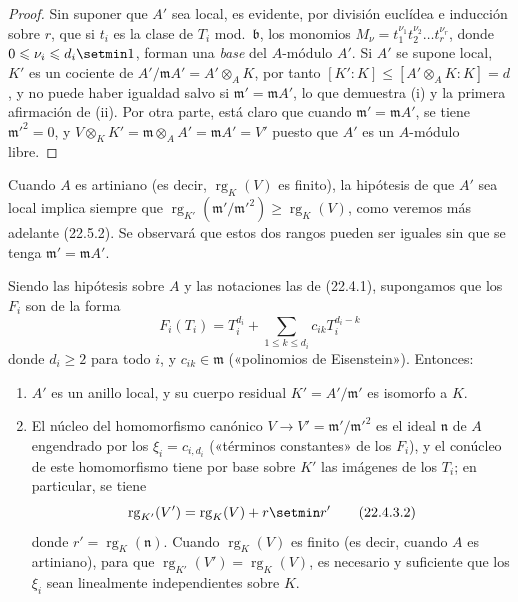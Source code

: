 \begin{proof}
Sin suponer que $A'$ sea local, es evidente, por división euclídea e
inducción sobre $r$, que si $t_i$ es la clase de $T_i$ mod.~$\mathfrak b$,
los monomios
$M_\nu=t_1^{\nu_1}t_2^{\nu_2}\ldots t_r^{\nu_r}$, donde
$0\leqslant\nu_i\leqslant d_i\setmin 1$, forman una \emph{base} del $A$-módulo $A'$. Si
$A'$ se supone local, $K'$ es un cociente de
$A'/\mathfrak mA'=A'\otimes_AK$, por tanto
$[K':K]\leqslant[A'\otimes_AK:K]=d$, y no puede haber igualdad salvo si
$\mathfrak m'=\mathfrak mA'$, lo que demuestra (i) y la primera afirmación
de (ii). Por otra parte, está claro que cuando
$\mathfrak m'=\mathfrak mA'$, se tiene $\mathfrak m'^2=0$, y
$V\otimes_KK'=\mathfrak m\otimes_AA'=\mathfrak mA'=V'$ puesto que $A'$ es
un $A$-módulo libre.
\end{proof}

\begin{remark}[22.4.2]
\label{0.22.4.2-fr}
Cuando $A$ es artiniano (es decir, $\operatorname{rg}_K(V)$ es finito),
la hipótesis de que $A'$ sea local implica siempre que
$\operatorname{rg}_{K'}(\mathfrak m'/\mathfrak m'^2)
\geqslant\operatorname{rg}_K(V)$, como veremos más adelante (22.5.2).
Se observará que estos dos rangos pueden ser iguales sin que se tenga
$\mathfrak m'=\mathfrak mA'$.
\end{remark}

\begin{proposition}[22.4.3]
\label{0.22.4.3-fr}
Siendo las hipótesis sobre $A$ y las notaciones las de \textup{(22.4.1)}, supongamos
que los $F_i$ son de la forma
\begin{equation}
\label{0.22.4.3.1-fr}
  F_i(T_i)=T_i^{d_i}+\sum_{1\leqslant k\leqslant d_i}
  c_{ik}T_i^{d_i-k}
  \tag{22.4.3.1}
\end{equation}
donde $d_i\geqslant2$ para todo $i$, y $c_{ik}\in\mathfrak m$
(«polinomios de Eisenstein»). Entonces:
\begin{enumerate}
  \item[\textup{(i)}] $A'$ es un anillo local, y su cuerpo residual
  $K'=A'/\mathfrak m'$ es isomorfo a $K$.


  \item[\textup{(ii)}] El núcleo del homomorfismo canónico
  $V\to V'=\mathfrak m'/\mathfrak m'^2$ es el ideal $\mathfrak n$ de $A$
  engendrado por los $\xi_i=c_{i,d_i}$ («términos constantes» de los $F_i$), y
  el conúcleo de este homomorfismo tiene por base sobre $K'$ las imágenes de los $T_i$;
  en particular, se tiene
  \begin{equation}
  \label{0.22.4.3.2-fr}
    \operatorname{rg}_{K'}(V')=\operatorname{rg}_K(V)+r\setmin r'
    \tag{22.4.3.2}
  \end{equation}
  donde $r'=\operatorname{rg}_K(\mathfrak n)$. Cuando
  $\operatorname{rg}_K(V)$ es finito (es decir, cuando $A$ es
  artiniano), para que
  $\operatorname{rg}_{K'}(V')=\operatorname{rg}_K(V)$, es necesario y suficiente
  que los $\xi_i$ sean linealmente independientes sobre $K$.
\end{enumerate}
\end{proposition}

